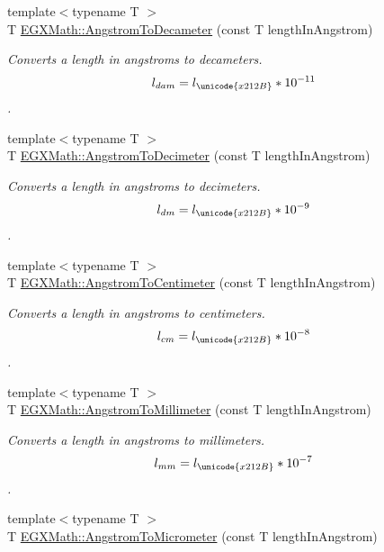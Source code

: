 \begin{DoxyCompactItemize}
{\footnotesize template$<$typename T $>$ }\\T \mbox{\hyperlink{group___e_g_x_math-_conversions-_length_conversions-_non-_s_i-_angstrom-_s_i_gad6c324d7dcb665375853d7ee463bfdbc}{E\+G\+X\+Math\+::\+Angstrom\+To\+Decameter}} (const T length\+In\+Angstrom)
\begin{DoxyCompactList}\small\item\em Converts a length in angstroms to decameters. \[ l_{dam}=l_{\unicode{x212B}} * 10^{-11} \]. \end{DoxyCompactList}\item 
{\footnotesize template$<$typename T $>$ }\\T \mbox{\hyperlink{group___e_g_x_math-_conversions-_length_conversions-_non-_s_i-_angstrom-_s_i_ga66b9d49fe6c0224b619d1c53e43acd23}{E\+G\+X\+Math\+::\+Angstrom\+To\+Decimeter}} (const T length\+In\+Angstrom)
\begin{DoxyCompactList}\small\item\em Converts a length in angstroms to decimeters. \[ l_{dm}=l_{\unicode{x212B}} * 10^{-9} \]. \end{DoxyCompactList}\item 
{\footnotesize template$<$typename T $>$ }\\T \mbox{\hyperlink{group___e_g_x_math-_conversions-_length_conversions-_non-_s_i-_angstrom-_s_i_gac4071068c7a0cfddbf572aab3be97f7b}{E\+G\+X\+Math\+::\+Angstrom\+To\+Centimeter}} (const T length\+In\+Angstrom)
\begin{DoxyCompactList}\small\item\em Converts a length in angstroms to centimeters. \[ l_{cm}=l_{\unicode{x212B}} * 10^{-8} \]. \end{DoxyCompactList}\item 
{\footnotesize template$<$typename T $>$ }\\T \mbox{\hyperlink{group___e_g_x_math-_conversions-_length_conversions-_non-_s_i-_angstrom-_s_i_ga5c25ae7d55cebff67920d7c059d1e28e}{E\+G\+X\+Math\+::\+Angstrom\+To\+Millimeter}} (const T length\+In\+Angstrom)
\begin{DoxyCompactList}\small\item\em Converts a length in angstroms to millimeters. \[ l_{mm}=l_{\unicode{x212B}} * 10^{-7} \]. \end{DoxyCompactList}\item 
{\footnotesize template$<$typename T $>$ }\\T \mbox{\hyperlink{group___e_g_x_math-_conversions-_length_conversions-_non-_s_i-_angstrom-_s_i_gab15b376d5a5fc7896a5f5cb6278f782c}{E\+G\+X\+Math\+::\+Angstrom\+To\+Micrometer}} (const T length\+In\+Angstrom)

\end{DoxyCompactItemize}
